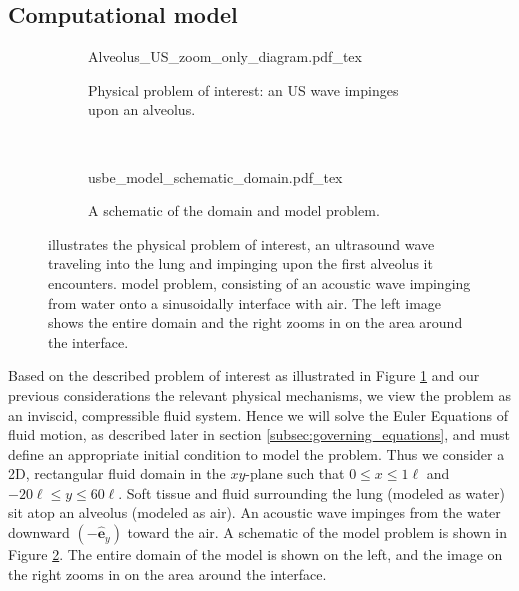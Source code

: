 \documentclass{jfm}%
\newcommand{\bs}[1]{\boldsymbol{#1}}
\begin{document}
\subsection{Computational model}
\label{subsec:setup}
%
\begin{figure}
  \centering
  \begin{subfigure}[b]{0.3\textwidth}
    \centering
    \def\svgwidth{\textwidth}
    {Alveolus_US_zoom_only_diagram.pdf_tex} \hfill%
    \caption{\label{fig:alveolar_schematic} Physical problem of interest: an \ac{US} wave impinges upon an alveolus.}
  \end{subfigure}
  ~
  \begin{subfigure}[b]{0.65\textwidth}
    \centering
    \def\svgwidth{\textwidth}
    {usbe_model_schematic_domain.pdf_tex} \hfill%
    \caption{\label{fig:problem_schematic} A schematic of the domain and model problem.}
  \end{subfigure}
  \caption[A schematic view of the physical and model
  problems]{\protect{} illustrates the
    physical problem of interest, an ultrasound wave traveling into
    the lung and impinging upon the first alveolus it
    encounters.  model problem,
    consisting of an acoustic wave impinging from water onto a
    sinusoidally interface with air. The left image shows the entire
    domain and the right zooms in on the area around the interface.}
  \label{fig:schematics}
\end{figure}
% 
Based on the described problem of interest as illustrated in Figure
\ref{fig:alveolar_schematic} and our previous considerations the
relevant physical mechanisms, we view the problem as an inviscid,
compressible fluid system. Hence we will solve the Euler Equations of
fluid motion, as described later in section
\ref{subsec:governing_equations}, and must define an appropriate
initial condition to model the problem. Thus we consider a 2D,
rectangular fluid domain in the $xy$-plane such that
$0\leq x\leq 1\ell$ and $-20\ell\leq y\leq 60\ell$. Soft tissue and
fluid surrounding the lung (modeled as water) sit atop an alveolus
(modeled as air). An acoustic wave impinges from the water downward
$(-\bs{\hat{e}}_y)$ toward the air. A schematic of the model problem
is shown in Figure \ref{fig:problem_schematic}. The entire domain of
the model is shown on the left, and the image on the right zooms in on
the area around the interface.
\end{document}
